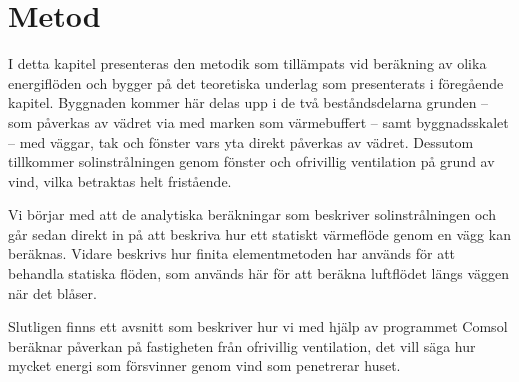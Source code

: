 \chapter{Metod}

I detta kapitel presenteras den metodik som tillämpats vid beräkning av olika energiflöden och bygger på det teoretiska underlag som presenterats i föregående kapitel. Byggnaden kommer här delas upp i de två beståndsdelarna grunden – som påverkas av vädret via med marken som värmebuffert – samt byggnadsskalet – med väggar, tak och fönster vars yta direkt påverkas av vädret. Dessutom tillkommer solinstrålningen genom fönster och ofrivillig ventilation på grund av vind, vilka betraktas helt fristående.

Vi börjar med att de analytiska beräkningar som beskriver solinstrålningen och går sedan direkt in på att beskriva hur ett statiskt värmeflöde genom en vägg kan beräknas. Vidare beskrivs hur finita elementmetoden har används för att behandla statiska flöden, som används här för att beräkna luftflödet längs väggen när det blåser.

Slutligen finns ett avsnitt som beskriver hur vi med hjälp av programmet Comsol beräknar påverkan på fastigheten från ofrivillig ventilation, det vill säga hur mycket energi som försvinner genom vind som penetrerar huset. 






